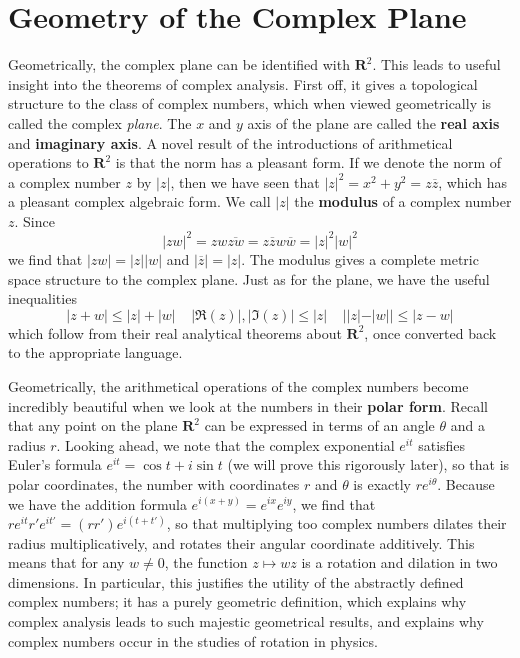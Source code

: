 \section{Geometry of the Complex Plane}

Geometrically, the complex plane can be identified with $\mathbf{R}^2$. This leads to useful insight into the theorems of complex analysis. First off, it gives a topological structure to the class of complex numbers, which when viewed geometrically is called the complex {\it plane}. The $x$ and $y$ axis of the plane are called the {\bf real axis} and {\bf imaginary axis}. A novel result of the introductions of arithmetical operations to $\mathbf{R}^2$ is that the norm has a pleasant form. If we denote the norm of a complex number $z$ by $|z|$, then we have seen that $|z|^2 = x^2 + y^2 = z\overline{z}$, which has a pleasant complex algebraic form. We call $|z|$ the {\bf modulus} of a complex number $z$. Since
%
\[ |zw|^2 = zw \overline{zw} = z\overline{z} w \overline{w} = |z|^2|w|^2 \]
%
we find that $|zw| = |z||w|$ and $|\overline{z}| = |z|$. The modulus gives a complete metric space structure to the complex plane. Just as for the plane, we have the useful inequalities
%
\[ |z+w| \leq |z| + |w|\ \ \ \ \ |\Re(z)|, |\Im(z)| \leq |z|\ \ \ \ \ ||z| - |w|| \leq |z - w| \]
%
which follow from their real analytical theorems about $\mathbf{R}^2$, once converted back to the appropriate language.

Geometrically, the arithmetical operations of the complex numbers become incredibly beautiful when we look at the numbers in their {\bf polar form}. Recall that any point on the plane $\mathbf{R}^2$ can be expressed in terms of an angle $\theta$ and a radius $r$. Looking ahead, we note that the complex exponential $e^{it}$ satisfies Euler's formula $e^{it} = \cos t + i \sin t$ (we will prove this rigorously later), so that is polar coordinates, the number with coordinates $r$ and $\theta$ is exactly $re^{i\theta}$. Because we have the addition formula $e^{i(x + y)} = e^{ix}e^{iy}$, we find that $re^{it}r'e^{it'} = (rr')e^{i(t + t')}$, so that multiplying too complex numbers dilates their radius multiplicatively, and rotates their angular coordinate additively. This means that for any $w \neq 0$, the function $z \mapsto wz$ is a rotation and dilation in two dimensions. In particular, this justifies the utility of the abstractly defined complex numbers; it has a purely geometric definition, which explains why complex analysis leads to such majestic geometrical results, and explains why complex numbers occur in the studies of rotation in physics.

